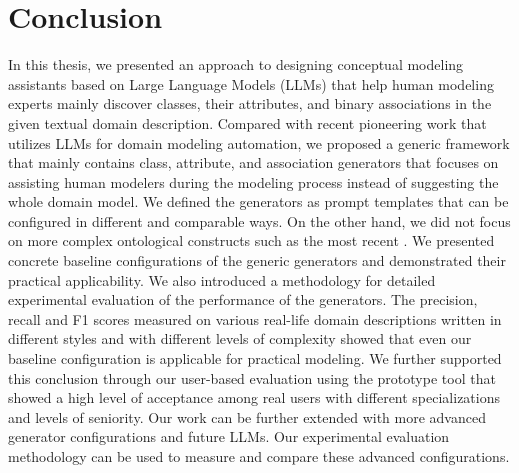 \chapter{Conclusion}

In this thesis, we presented an approach to designing conceptual modeling assistants based on Large Language Models (LLMs) that help human modeling experts mainly discover classes, their attributes, and binary associations in the given textual domain description.
Compared with recent pioneering work that utilizes LLMs for domain modeling automation, we proposed a generic framework that mainly contains class, attribute, and association generators that focuses on assisting human modelers during the modeling process instead of suggesting the whole domain model.
We defined the generators as prompt templates that can be configured in different and comparable ways.
On the other hand, we did not focus on more complex ontological constructs such as the most recent \cite{Saeedizade2024}.
We presented concrete baseline configurations of the generic generators and demonstrated their practical applicability.
We also introduced a methodology for detailed experimental evaluation of the performance of the generators.
The precision, recall and F1 scores measured on various real-life domain descriptions written in different styles and with different levels of complexity showed that even our baseline configuration is applicable for practical modeling.
We further supported this conclusion through our user-based evaluation using the prototype tool that showed a high level of acceptance among real users with different specializations and levels of seniority.
Our work can be further extended with more advanced generator configurations and future LLMs.
Our experimental evaluation methodology can be used to measure and compare these advanced configurations.